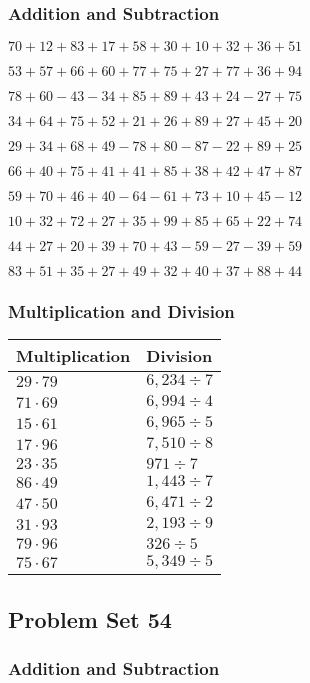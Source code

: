 \hypertarget{addition-and-subtraction-93}{%
\subsubsection{Addition and
Subtraction}\label{addition-and-subtraction-93}}

\(70+12+83+17+58+30+10+32+36+ 51\)

\(53+57+66+60+77+75+27+77+36+94\)

\(78+60-43-34+85+89+43+24-27+75\)

\(34+64+75+52+21+26+89+27+45+20\)

\(29+34+68+49-78+80-87-22+89+25\)

\(66+40+75+41+41+85+38+42+47+87\)

\(59+70+46+40-64-61+73+10+45-12\)

\(10+32+72+27+35+99+85+65+22+74\)

\(44+27+20+39+70+43-59-27-39+59\)

\(83+51+35+27+49+32+40+37+88+44\)

\hypertarget{multiplication-and-division-93}{%
\subsubsection{Multiplication and
Division}\label{multiplication-and-division-93}}

\begin{longtable}[]{@{}ll@{}}
\toprule
Multiplication & Division\tabularnewline
\midrule
\endhead
\(29\cdot79\) & \(6,234÷7\)\tabularnewline
\(71\cdot69\) & \(6,994÷4\)\tabularnewline
\(15\cdot61\) & \(6,965÷5\)\tabularnewline
\(17\cdot96\) & \(7,510÷8\)\tabularnewline
\(23\cdot35\) & \(971÷7\)\tabularnewline
\(86\cdot49\) & \(1,443÷7\)\tabularnewline
\(47\cdot50\) & \(6,471÷2\)\tabularnewline
\(31\cdot93\) & \(2,193÷9\)\tabularnewline
\(79\cdot96\) & \(326÷5\)\tabularnewline
\(75\cdot67\) & \(5,349÷5\)\tabularnewline
\bottomrule
\end{longtable}

\hypertarget{problem-set-54}{%
\subsection{Problem Set 54}\label{problem-set-54}}

\hypertarget{addition-and-subtraction-94}{%
\subsubsection{Addition and
Subtraction}\label{addition-and-subtraction-94}}

